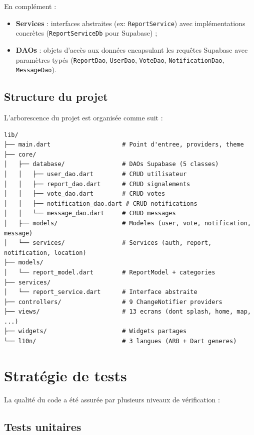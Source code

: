 \documentclass[12pt,a4paper]{report}
\begin{document}
En complément :
\begin{itemize}
    \item \textbf{Services} : interfaces abstraites (ex: \texttt{ReportService}) avec implémentations concrètes (\texttt{ReportServiceDb} pour Supabase) ;
    \item \textbf{DAOs} : objets d'accès aux données encapsulant les requêtes Supabase avec paramètres typés (\texttt{ReportDao}, \texttt{UserDao}, \texttt{VoteDao}, \texttt{NotificationDao}, \texttt{MessageDao}).
\end{itemize}

\subsection{Structure du projet}

L'arborescence du projet est organisée comme suit :

\begin{lstlisting}[style=codeblock, caption=Structure du projet Flutter]
lib/
├── main.dart                    # Point d'entree, providers, theme
├── core/
│   ├── database/                # DAOs Supabase (5 classes)
│   │   ├── user_dao.dart        # CRUD utilisateur
│   │   ├── report_dao.dart      # CRUD signalements
│   │   ├── vote_dao.dart        # CRUD votes
│   │   ├── notification_dao.dart # CRUD notifications
│   │   └── message_dao.dart     # CRUD messages
│   ├── models/                  # Modeles (user, vote, notification, message)
│   └── services/                # Services (auth, report, notification, location)
├── models/
│   └── report_model.dart        # ReportModel + categories
├── services/
│   └── report_service.dart      # Interface abstraite
├── controllers/                 # 9 ChangeNotifier providers
├── views/                       # 13 ecrans (dont splash, home, map, ...)
├── widgets/                     # Widgets partages
└── l10n/                        # 3 langues (ARB + Dart generes)
\end{lstlisting}

\section{Stratégie de tests}

La qualité du code a été assurée par plusieurs niveaux de vérification :

\subsection{Tests unitaires}
\end{document}
